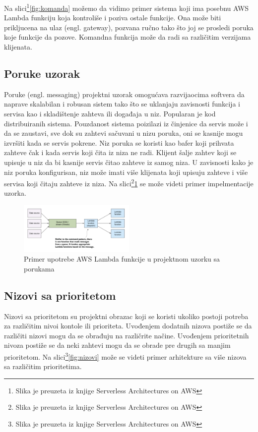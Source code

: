 \documentclass[12pt,oneside]{memoir}
\begin{document}
Na slici\footnote{Slika je preuzeta iz knjige Serverless Architectures on AWS}\ref{fig:komanda} možemo da vidimo primer sistema koji ima posebnu AWS Lambda funkciju koja kontroliše i poziva ostale funkcije. Ona može biti prikljucena na ulaz (engl. gateway), pozvana ručno tako što joj se prosledi poruka koje funkcije da pozove. Komandna funkcija može da radi sa različitim verzijama klijenata.

\subsection{Poruke uzorak} %

Poruke (engl. messaging) projektni uzorak omogućava razvijaocima softvera da naprave skalabilan i robusan sistem tako što se uklanjaju zavisnosti funkcija i servisa kao i skladištenje zahteva ili događaja u niz. Popularan je kod distribuiranih sistema\cite{sa}. Pouzdanost sistema poizilazi iz činjenice da servis može i da se zaustavi, sve dok su zahtevi sačuvani u nizu poruka, oni se kasnije mogu izvršiti kada se servis pokrene. Niz poruka se koristi kao bafer koji prihvata zahteve čak i kada servis koji čita iz niza ne radi. Klijent šalje zahtev koji se upisuje u niz da bi kasnije servis čitao zahteve iz samog niza. U zavisnosti kako je niz poruka konfigurisan, niz može imati više klijenata koji upisuju zahteve i više servisa koji čitaju zahteve iz niza. Na slici\footnote{Slika je preuzeta iz knjige Serverless Architectures on AWS}\ref{fig:poruke} se može videti primer impelmentacije uzorka.

\begin{figure}[!ht]
  \centering
  \includegraphics[width=0.5\textwidth]{Slika 13.png}
  \caption{Primer upotrebe AWS Lambda funkcije u projektnom uzorku sa porukama}
  \label{fig:poruke}
\end{figure}
 
\subsection{Nizovi sa prioritetom}
Nizovi sa prioritetom su projektni obrazac koji se koristi ukoliko postoji potreba za različitim nivoi kontole ili prioriteta. Uvođenjem dodatnih nizova postiže se da različiti nizovi mogu da se obrađuju na različrite načine. Uvođenjem prioritetnih nivoza postiže se da neki zahtevi mogu da se obrade pre drugih sa manjim prioritetom. Na slici\footnote{Slika je preuzeta iz knjige Serverless Architectures on AWS}\ref{fig:nizovi} može se videti primer arhitekture sa više nizova sa različitim prioritetima.
\end{document}
